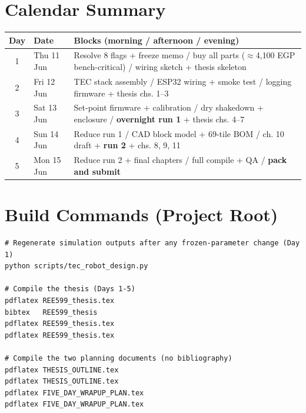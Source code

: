 \documentclass[11pt,a4paper]{article}
\begin{document}
\section{Calendar Summary}
\begin{center}
\small
\renewcommand{\arraystretch}{1.3}
\begin{longtable}{@{}clp{8.6cm}@{}}
\toprule
\textbf{Day} & \textbf{Date} & \textbf{Blocks (morning / afternoon / evening)} \\
\midrule
\endhead
\rowcolor{rowA} 1 & Thu 11 Jun & Resolve 8 flags + freeze memo / buy all parts ($\approx$4{,}100 EGP bench-critical) / wiring sketch + thesis skeleton \\
\rowcolor{rowB} 2 & Fri 12 Jun & TEC stack assembly / ESP32 wiring + smoke test / logging firmware + thesis chs. 1--3 \\
\rowcolor{rowB} 3 & Sat 13 Jun & Set-point firmware + calibration / dry shakedown + enclosure / \textbf{overnight run 1} + thesis chs. 4--7 \\
\rowcolor{rowC} 4 & Sun 14 Jun & Reduce run 1 / CAD block model + 69-tile BOM / ch. 10 draft + \textbf{run 2} + chs. 8, 9, 11 \\
\rowcolor{rowD} 5 & Mon 15 Jun & Reduce run 2 + final chapters / full compile + QA / \textbf{pack and submit} \\
\bottomrule
\end{longtable}
\end{center}

\section{Build Commands (Project Root)}
\begin{verbatim}
# Regenerate simulation outputs after any frozen-parameter change (Day 1)
python scripts/tec_robot_design.py

# Compile the thesis (Days 1-5)
pdflatex REE599_thesis.tex
bibtex   REE599_thesis
pdflatex REE599_thesis.tex
pdflatex REE599_thesis.tex

# Compile the two planning documents (no bibliography)
pdflatex THESIS_OUTLINE.tex
pdflatex THESIS_OUTLINE.tex
pdflatex FIVE_DAY_WRAPUP_PLAN.tex
pdflatex FIVE_DAY_WRAPUP_PLAN.tex
\end{verbatim}
\end{document}
